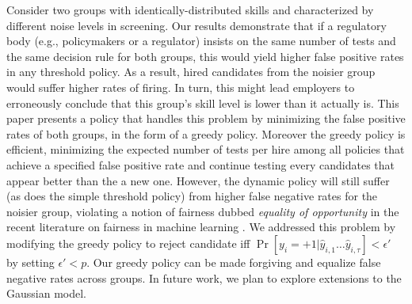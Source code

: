 Consider two groups with identically-distributed skills
and characterized by different noise levels in screening. 
Our results demonstrate that if a regulatory body
(e.g., policymakers or a regulator) 
insists on the same number of tests 
and the same decision rule for both groups, 
this would yield higher false positive rates in any threshold policy. 
As a result, hired candidates from the noisier group 
would suffer higher rates of firing.
In turn, this might lead employers to erroneously conclude 
that this group's skill level is lower than it actually is.
This paper presents a policy that handles this problem 
by minimizing the false positive rates of both groups, 
in the form of a greedy policy. 
Moreover the greedy policy is efficient,
minimizing the expected number of tests per hire
among all policies that achieve a specified false positive rate and continue testing every candidates that appear better than the a new one.
However, the dynamic policy will still suffer 
(as does the simple threshold policy)
from higher false negative rates for the noisier group,
violating a notion of fairness dubbed 
\emph{equality of opportunity} in the recent literature 
on fairness in machine learning \cite{hardt2016equality}. 
We addressed this problem by modifying the greedy policy 
to reject candidate
iff 
$\Pr[y_i=+1|\hat{y}_{i,1}\dots \hat{y}_{i,\tau}]<\epsilon'$ by setting $\epsilon' < p$.
Our greedy policy can be made  forgiving and equalize false negative rates across groups.
In future work, we plan to explore extensions to the Gaussian model.